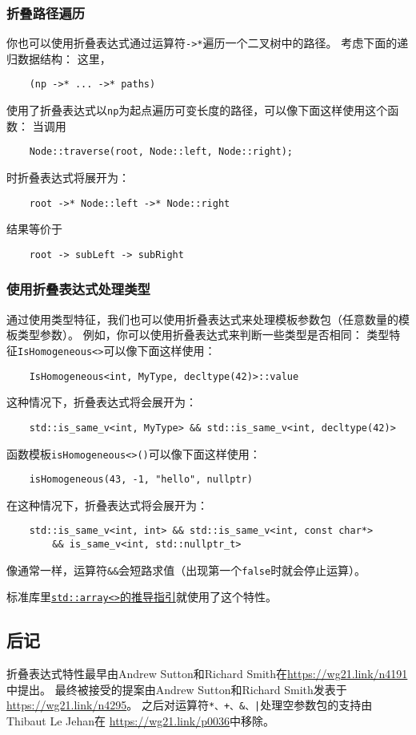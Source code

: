 \subsubsection*{折叠路径遍历}
你也可以使用折叠表达式通过运算符\texttt{->*}遍历一个二叉树中的路径。
考虑下面的递归数据结构：
这里，
\begin{lstlisting}
    (np ->* ... ->* paths)
\end{lstlisting}
使用了折叠表达式以\texttt{np}为起点遍历可变长度的路径，可以像下面这样使用这个函数：
当调用
\begin{lstlisting}
    Node::traverse(root, Node::left, Node::right);
\end{lstlisting}
时折叠表达式将展开为：
\begin{lstlisting}
    root ->* Node::left ->* Node::right
\end{lstlisting}
结果等价于
\begin{lstlisting}
    root -> subLeft -> subRight
\end{lstlisting}

\subsubsection{使用折叠表达式处理类型}
通过使用类型特征，我们也可以使用折叠表达式来处理模板参数包（任意数量的模板类型参数）。
例如，你可以使用折叠表达式来判断一些类型是否相同：
类型特征\texttt{IsHomogeneous<>}可以像下面这样使用：
\begin{lstlisting}
    IsHomogeneous<int, MyType, decltype(42)>::value
\end{lstlisting}
这种情况下，折叠表达式将会展开为：
\begin{lstlisting}
    std::is_same_v<int, MyType> && std::is_same_v<int, decltype(42)>
\end{lstlisting}
函数模板\texttt{isHomogeneous<>()}可以像下面这样使用：
\begin{lstlisting}
    isHomogeneous(43, -1, "hello", nullptr)
\end{lstlisting}
在这种情况下，折叠表达式将会展开为：
\begin{lstlisting}
    std::is_same_v<int, int> && std::is_same_v<int, const char*>
        && is_same_v<int, std::nullptr_t>
\end{lstlisting}
像通常一样，运算符\texttt{\&\&}会短路求值（出现第一个\texttt{false}时就会停止运算）。

标准库里\hyperref[ch9.2.6.3]{\texttt{std::array<>}的推导指引}就使用了这个特性。

\subsection{后记}
折叠表达式特性最早由Andrew Sutton和Richard Smith在\url{https://wg21.link/n4191}中提出。
最终被接受的提案由Andrew Sutton和Richard Smith发表于\url{https://wg21.link/n4295}。
之后对运算符\texttt{*、+、\&、|}处理空参数包的支持由Thibaut Le Jehan在
\url{https://wg21.link/p0036}中移除。

\setcounter{footnote}{0}
